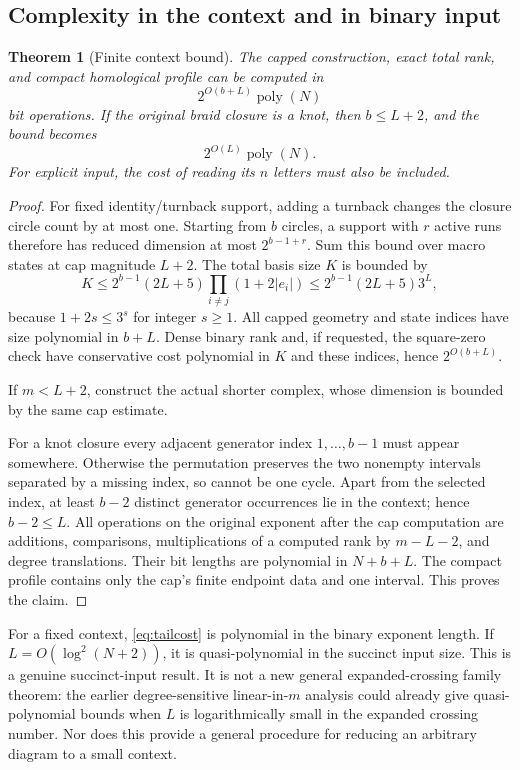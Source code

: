 \documentclass[11pt]{article}
\newtheorem{theorem}{Theorem}[section]
\theoremstyle{definition}
\theoremstyle{remark}
\newcommand{\poly}{\operatorname{poly}}
\begin{document}
\subsection{Complexity in the context and in binary input}
\begin{theorem}[Finite context bound]
\label{thm:tailcost}
The capped construction, exact total rank, and compact homological profile can be computed in
\[
 2^{O(b+L)}\poly(N)
\]
bit operations. If the original braid closure is a knot, then $b\le L+2$, and the bound becomes
\begin{equation}
 2^{O(L)}\poly(N).
 \label{eq:tailcost}
\end{equation}
For explicit input, the cost of reading its $n$ letters must also be included.
\end{theorem}
\begin{proof}
For fixed identity/turnback support, adding a turnback changes the closure circle count by at most one. Starting from $b$ circles, a support with $r$ active runs therefore has reduced dimension at most $2^{b-1+r}$. Sum this bound over macro states at cap magnitude $L+2$. The total basis size $K$ is bounded by
\[
 K\le 2^{b-1}(2L+5)\prod_{i\ne j}(1+2|e_i|)
   \le 2^{b-1}(2L+5)3^L,
\]
because $1+2s\le3^s$ for integer $s\ge1$. All capped geometry and state indices have size polynomial in $b+L$. Dense binary rank and, if requested, the square-zero check have conservative cost polynomial in $K$ and these indices, hence $2^{O(b+L)}$.

If $m<L+2$, construct the actual shorter complex, whose dimension is bounded by the same cap estimate.

For a knot closure every adjacent generator index $1,\ldots,b-1$ must appear somewhere. Otherwise the permutation preserves the two nonempty intervals separated by a missing index, so cannot be one cycle. Apart from the selected index, at least $b-2$ distinct generator occurrences lie in the context; hence $b-2\le L$. All operations on the original exponent after the cap computation are additions, comparisons, multiplications of a computed rank by $m-L-2$, and degree translations. Their bit lengths are polynomial in $N+b+L$. The compact profile contains only the cap's finite endpoint data and one interval. This proves the claim.
\end{proof}

For a fixed context, \eqref{eq:tailcost} is polynomial in the binary exponent length. If $L=O(\log^2(N+2))$, it is quasi-polynomial in the succinct input size. This is a genuine succinct-input result. It is not a new general expanded-crossing family theorem: the earlier degree-sensitive linear-in-$m$ analysis could already give quasi-polynomial bounds when $L$ is logarithmically small in the expanded crossing number. Nor does this provide a general procedure for reducing an arbitrary diagram to a small context.
\end{document}
